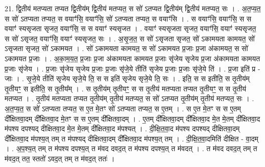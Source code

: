 \documentclass[17pt]{extarticle}
\begin{document}
21. द्वि॒तीय॑ मतप्यता तप्यत द्वि॒तीय॑म् द्वि॒तीय॑ मतप्यत॒ स सो॑ ऽतप्यत द्वि॒तीय॑म् द्वि॒तीय॑ मतप्यत॒ सः । . अ॒त॒प्य॒त॒ स सो॑ ऽतप्यता तप्यत॒ स वयाꣳ॑सि॒ वयाꣳ॑सि॒ सो॑ ऽतप्यता तप्यत॒ स वयाꣳ॑सि । . स वयाꣳ॑सि॒ वयाꣳ॑सि॒ स स वयाꣳ॑ स्यसृजता सृजत॒ वयाꣳ॑सि॒ स स वयाꣳ॑ स्यसृजत । . वयाꣳ॑ स्यसृजता सृजत॒ वयाꣳ॑सि॒ वयाꣳ॑ स्यसृजत॒ स सो॑ ऽसृजत॒ वयाꣳ॑सि॒ वयाꣳ॑ स्यसृजत॒ सः । . अ॒सृ॒ज॒त॒ स सो॑ ऽसृजता सृजत॒ सो॑ ऽकामयता कामयत॒ सो॑ ऽसृजता सृजत॒ सो॑ ऽकामयत । . सो॑ ऽकामयता कामयत॒ स सो॑ ऽकामयत प्र॒जाः प्र॒जा अ॑कामयत॒ स सो॑ ऽकामयत प्र॒जाः । . अ॒का॒म॒य॒त॒ प्र॒जाः प्र॒जा अ॑कामयता कामयत प्र॒जाः सृ॑जेय सृजेय प्र॒जा अ॑कामयता कामयत प्र॒जाः सृ॑जेय । . प्र॒जाः सृ॑जेय सृजेय प्र॒जाः प्र॒जाः सृ॑जे॒ये तीति॑ सृजेय प्र॒जाः प्र॒जाः सृ॑जे॒ये ति॑ । . प्र॒जा इति॑ प्र - जाः । . सृ॒जे॒ये तीति॑ सृजेय सृजे॒ये ति॒ स स इति॑ सृजेय सृजे॒ये ति॒ सः । . इति॒ स स इतीति॒ स तृ॒तीय॑म् तृ॒तीयꣳ॒॒ स इतीति॒ स तृ॒तीय᳚म् । . स तृ॒तीय॑म् तृ॒तीयꣳ॒॒ स स तृ॒तीय॑ मतप्यता तप्यत तृ॒तीयꣳ॒॒ स स तृ॒तीय॑ मतप्यत । . तृ॒तीय॑ मतप्यता तप्यत तृ॒तीय॑म् तृ॒तीय॑ मतप्यत॒ स सो॑ ऽतप्यत तृ॒तीय॑म् तृ॒तीय॑ मतप्यत॒ सः । . अ॒त॒प्य॒त॒ स सो॑ ऽतप्यता तप्यत॒ स ए॒त मे॒तꣳ सो॑ ऽतप्यता तप्यत॒ स ए॒तम् । . स ए॒त मे॒तꣳ स स ए॒तम् दी᳚क्षितवा॒दम् दी᳚क्षितवा॒द मे॒तꣳ स स ए॒तम् दी᳚क्षितवा॒दम् । . ए॒तम् दी᳚क्षितवा॒दम् दी᳚क्षितवा॒द मे॒त मे॒तम् दी᳚क्षितवा॒द म॑पश्य दपश्यद् दीक्षितवा॒द मे॒त मे॒तम् दी᳚क्षितवा॒द म॑पश्यत् । . दी॒क्षि॒त॒वा॒द म॑पश्य दपश्यद् दीक्षितवा॒दम् दी᳚क्षितवा॒द म॑पश्य॒त् तम् त म॑पश्यद् दीक्षितवा॒दम् दी᳚क्षितवा॒द म॑पश्य॒त् तम् । . दी॒क्षि॒त॒वा॒दमिति॑ दीक्षित - वा॒दम् । . अ॒प॒श्य॒त् तम् त म॑पश्य दपश्य॒त् त म॑वद दवद॒त् त म॑पश्य दपश्य॒त् त म॑वदत् । . त म॑वद दवद॒त् तम् त म॑वद॒त् तत॒ स्ततो॑ ऽवद॒त् तम् त म॑वद॒त् ततः॑ । \newline
\end{document}
